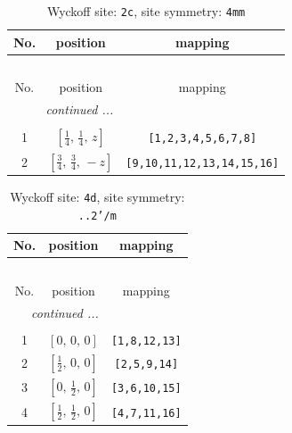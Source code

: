 \documentclass[fleqn,8pt]{jsarticle}
\begin{document}
\renewcommand{\arraystretch}{1.2}
\begin{longtable}{ccc}
\caption{Wyckoff site: {\tt 2c}, site symmetry: {\tt 4mm}}
 \\
 \hline \hline
No. & position & mapping \\ \hline \endfirsthead

\multicolumn{2}{l}{\tablename\ \thetable{}} \\
 \hline \hline
No. & position & mapping \\ \hline \endhead

 \hline \hline
\multicolumn{2}{r}{\footnotesize\it continued ...} \\ \endfoot

 \hline \hline
\multicolumn{2}{r}{} \\ \endlastfoot

1 & $\left[ \frac{1}{4},\, \frac{1}{4},\, z \right]$ & {\tt [1,2,3,4,5,6,7,8]} \\ \hline
2 & $\left[ \frac{3}{4},\, \frac{3}{4},\, - z \right]$ & {\tt [9,10,11,12,13,14,15,16]} \\
\end{longtable}
\renewcommand{\arraystretch}{1.2}
\begin{longtable}{ccc}
\caption{Wyckoff site: {\tt 4d}, site symmetry: {\tt ..2'/m}}
 \\
 \hline \hline
No. & position & mapping \\ \hline \endfirsthead

\multicolumn{2}{l}{\tablename\ \thetable{}} \\
 \hline \hline
No. & position & mapping \\ \hline \endhead

 \hline \hline
\multicolumn{2}{r}{\footnotesize\it continued ...} \\ \endfoot

 \hline \hline
\multicolumn{2}{r}{} \\ \endlastfoot

1 & $\left[ 0,\, 0,\, 0 \right]$ & {\tt [1,8,12,13]} \\ \hline
2 & $\left[ \frac{1}{2},\, 0,\, 0 \right]$ & {\tt [2,5,9,14]} \\ \hline
3 & $\left[ 0,\, \frac{1}{2},\, 0 \right]$ & {\tt [3,6,10,15]} \\ \hline
4 & $\left[ \frac{1}{2},\, \frac{1}{2},\, 0 \right]$ & {\tt [4,7,11,16]} \\
\end{longtable}
\renewcommand{\arraystretch}{1.2}
\end{document}
